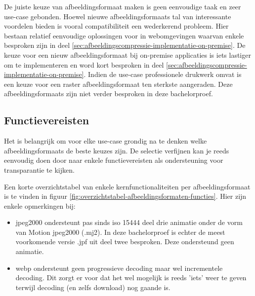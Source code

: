 De juiste keuze van \gls{afbeeldingsformaat} maken is geen eenvoudige taak en zeer \gls{use-case} gebonden. Hoewel nieuwe \glspl{afbeeldingsformaat} tal van interessante voordelen bieden is vooral compatibiliteit een wederkerend probleem. Hier bestaan relatief eenvoudige oplossingen voor in webomgevingen waarvan enkele besproken zijn in deel \ref{sec:afbeeldingscompressie-implementatie-on-premise}. De keuze voor een nieuw \gls{afbeeldingsformaat} bij \gls{on-premise} applicaties is iets lastiger om te implementeren en word kort besproken in deel \ref{sec:afbeeldingscompressie-implementatie-on-premise}. Indien de \gls{use-case} professionele drukwerk omvat is een keuze voor een \gls{raster} \gls{afbeeldingsformaat} ten sterkste aangeraden. Deze \glspl{afbeeldingsformaat} zijn niet verder besproken in deze bachelorproef.

\subsection{Functievereisten}
\label{sec:afbeeldingscompressie-functievereisten}

Het is belangrijk om voor elke \gls{use-case} grondig na te denken welke \glspl{afbeeldingsformaat} de beste keuzes zijn. De selectie verfijnen kan je reeds eenvoudig doen door naar enkele functievereisten als ondersteuning voor transparantie te kijken. 

Een korte overzichtstabel van enkele kernfunctionaliteiten per \gls{afbeeldingsformaat} is te vinden in figuur \ref{fig:overzichtstabel-afbeeldingsformaten-functies}. Hier zijn enkele opmerkingen bij:

\begin{itemize}
	\item \gls{jpeg2000} ondersteunt pas sinds \gls{iso} 15444 deel drie animatie onder de vorm van Motion \gls{jpeg2000} (.mj2). In deze bachelorproef is echter de meest voorkomende versie .jpf uit deel twee besproken. Deze ondersteund geen animatie.
	
	\item \Gls{webp} ondersteunt geen progressieve \gls{decoding} maar wel incrementele \gls{decoding}. Dit zorgt er voor dat het wel mogelijk is reeds 'iets' weer te geven terwijl \gls{decoding} (en zelfs download) nog gaande is.
\end{itemize}

